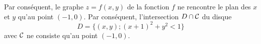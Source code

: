 \begin{enumerate}
{		Par conséquent, le graphe
		$z=f(x,y)$ de la fonction $f$ ne rencontre le plan des $x$ et $y$ qu'au point
		$(-1,0)$. Par cons\'equent, l'intersection 
		$D \cap \cal C$ du disque
		\[
		D=\{(x,y); (x+1)^2+y^2<1\}
		\]
		avec $\cal C$ ne consiste qu'au point $(-1,0)$.}
	
\end{enumerate}